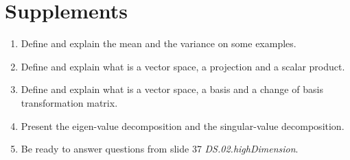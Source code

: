 \documentclass[a4paper]{article}
\begin{document}
\section*{Supplements}
\begin{enumerate}
    \item Define and explain the mean and the variance on some examples.
    \item Define and explain what is a vector space, a projection and a scalar product.
    \item Define and explain what is a vector space, a basis and a change of basis
transformation matrix.
    \item Present the eigen-value decomposition and the singular-value decomposition.
    \item Be ready to answer questions from slide 37 \textit{DS.02.highDimension}.
\end{enumerate}


%
\end{document}
